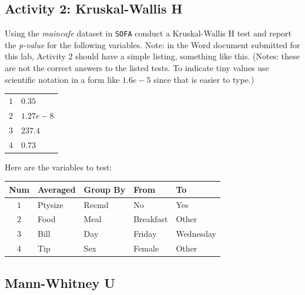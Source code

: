 \subsection{Activity 2: Kruskal-Wallis H} \label{nonpara:act02}

Using the \textit{maincafe} dataset in \texttt{SOFA} conduct a Kruskal-Wallis H test and report the \textit{p-value} for the following variables. Note: in the Word document submitted for this lab, Activity $ 2 $ should have a simple listing, something like this. (Notes: these are not the correct answers to the listed tests. To indicate tiny values use scientific notation in a form like $ 1.6e-5 $ since that is easier to type.)

\begin{center}
  \begin{tabular}{ll}
    $ 1 $ & $ 0.35 $ \\ 
    $ 2 $ & $ 1.27e-8 $ \\ 
    $ 3 $ & $ 237.4 $ \\ 
    $ 4 $ & $ 0.73 $ \\ 
  \end{tabular} 
\end{center}

Here are the variables to test:

\begin{center}
  \begin{tabular}{cllll}
    \hline 
    \textbf{Num} & \textbf{Averaged} & \textbf{Group By} & \textbf{From} & \textbf{To} \\ 
    \hline 
    $ 1 $ & Ptysize & Recmd & No & Yes \\ 
    $ 2 $ & Food & Meal & Breakfast & Other \\ 
    $ 3 $ & Bill & Day & Friday & Wednesday \\ 
    $ 4 $ & Tip & Sex & Female & Other \\ 
    \hline 
  \end{tabular} 
\end{center}

\subsection{Mann-Whitney U}

